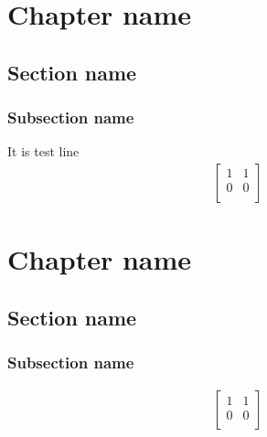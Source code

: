 \documentclass[12pt, fleqn]{book}
\begin{document}
\chapter{Chapter name }

\section{Section name}

\subsection{Subsection name}

It is test line
\begin{align*}
	\begin{bmatrix}
		1 & 1 \\
		0 & 0 \\
	\end{bmatrix}
\end{align*}






\chapter{Chapter name }

\section{Section name}

\subsection{Subsection name}

\begin{align*}
	\begin{bmatrix}
		1 & 1 \\
		0 & 0 \\
	\end{bmatrix}
\end{align*}
\end{document}
